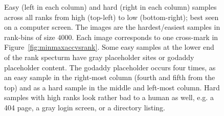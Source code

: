 \begin{figure}
    \centering
    \caption[Easy and hard samples across all ranks]{Easy (left in each column) and hard (right in each column) samples across all ranks from high (top-left) to low (bottom-right); best seen on a computer screen. The images are the hardest/easiest samples in rank-bins of size $4000$. Each image corresponds to one cross-mark in Figure~\ref{fig:minmaxaccvsrank}. Some easy samples at the lower end of the rank specturm have gray placeholder sites or godaddy placeholder content. The godaddy placeholder occurs four times, as an easy sample in the right-most column (fourth and fifth from the top) and as a hard sample in the middle and left-most column. Hard samples with high ranks look rather bad to a human as well, e.g. a 404 page, a gray login screen, or a directory listing.}\label{fig:hardandeasysamples}
\end{figure}

